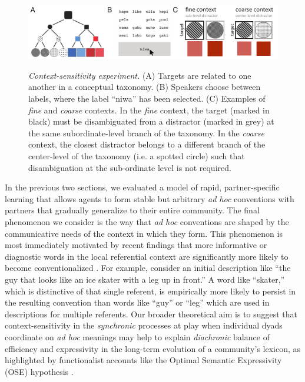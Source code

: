 \begin{figure}[t]
\begin{center}
{\includegraphics[scale=1.6]{./figures/Sec2-design.pdf}}
{\caption{{\emph{Context-sensitivity experiment.} (A) Targets are related to one another in a conceptual taxonomy. (B) Speakers choose between labels, where the label ``niwa'' has been selected. (C) Examples of \emph{fine} and \emph{coarse} contexts. In the \emph{fine} context, the target (marked in black) must be disambiguated from a distractor (marked in grey) at the same subordinate-level branch of the taxonomy.  In the \emph{coarse} context, the closest distractor belongs to a different branch of the center-level of the taxonomy (i.e. a spotted circle) such that disambiguation at the sub-ordinate level is not required. \label{fig:context_design}}}}
\end{center}
\end{figure}

In the previous two sections, we evaluated a model of rapid, partner-specific learning that allows agents to form stable but arbitrary \emph{ad hoc} conventions with partners that gradually generalize to their entire community. 
The final phenomenon we consider is the way that \emph{ad hoc} conventions are shaped by the communicative needs of the context in which they form.
This phenomenon is most immediately motivated by recent findings that more informative or diagnostic words in the local referential context are significantly more likely to become conventionalized \cite{hawkins2020characterizing}.
For example, consider an initial description like ``the guy that looks like an ice skater with a leg up in front.''
A word like ``skater,'' which is distinctive of that single referent, is empirically more likely to persist in the resulting convention than words like ``guy'' or ``leg'' which are used in descriptions for multiple referents.
Our broader theoretical aim is to suggest that context-sensitivity in the \emph{synchronic} processes at play when individual dyads coordinate on  \emph{ad hoc} meanings may help to explain \emph{diachronic} balance of efficiency and expressivity in the long-term evolution of a community's lexicon, as highlighted by functionalist accounts like the Optimal Semantic Expressivity (OSE) hypothesis \cite{frankblogpost}. 

